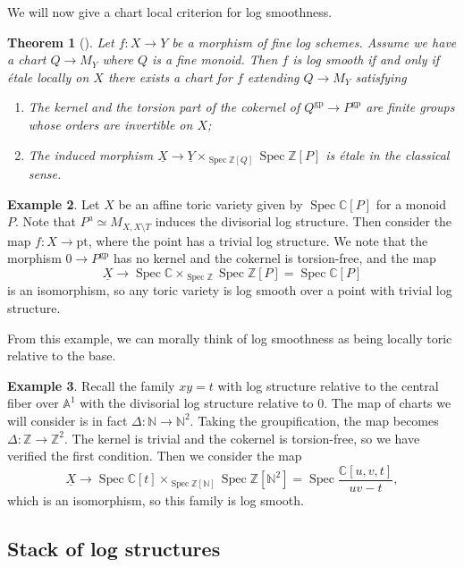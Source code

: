 \documentclass{amsart}
\newtheorem{thm}{Theorem}[section]
\theoremstyle{definition}
\newtheorem{exm}[thm]{Example}
\theoremstyle{remark}
\theoremstyle{plain}
\theoremstyle{definition}
\theoremstyle{remark}
\newcommand{\A}{\mathbb{A}}
\newcommand{\N}{\mathbb{N}}
\newcommand{\C}{\mathbb{C}}
\newcommand{\Z}{\mathbb{Z}}
\newcommand{\mr}[1]{\mathrm{#1}}
\newcommand{\ul}[1]{\underline{#1}}
\newcommand{\1}{\mathbf{1}}
\newcommand{\2}{\mathbf{2}}
\newcommand{\3}{\mathbf{3}}
\DeclareMathOperator{\Spec}{Spec}
\begin{document}
We will now give a chart local criterion for log smoothness.

\begin{thm}[{\cite[Theorem~3.5]{Kato1989}}]
    Let \(f \colon X \to Y\) be a morphism of fine log schemes. Assume we have a chart \(Q \to M_Y\) where \(Q\) is a fine monoid. Then \(f\) is log smooth if and only if \'etale locally on \(X\) there exists a chart for \(f\) extending \(Q \to M_Y\) satisfying
    \begin{enumerate}
        \item The kernel and the torsion part of the cokernel of \(Q^{\mr{gp}} \to P^{\mr{gp}}\) are finite groups whose orders are invertible on \(X\);
        \item The induced morphism \(\ul{X} \to \ul{Y} \times_{\Spec \Z[Q]} \Spec \Z[P]\) is \'etale in the classical sense.
    \end{enumerate}
\end{thm}

\begin{exm}
    Let \(X\) be an affine toric variety given by \(\Spec \C[P]\) for a monoid \(P\). Note that \(P^a \simeq M_{X, X \setminus T}\) induces the divisorial log structure. Then consider the map \(f \colon X \to \mr{pt}\), where the point has a trivial log structure. We note that the morphism \(0 \to P^{\mr{gp}}\) has no kernel and the cokernel is torsion-free, and the map
    \[ \ul{X} \to \Spec \C \times_{\Spec \Z} \Spec \Z[P] = \Spec \C[P] \]
    is an isomorphism, so any toric variety is log smooth over a point with trivial log structure.
\end{exm}

From this example, we can morally think of log smoothness as being locally toric relative to the base.

\begin{exm}
    Recall the family \(xy = t\) with log structure relative to the central fiber over \(\A^1\) with the divisorial log structure relative to \(0\). The map of charts we will consider is in fact \(\Delta \colon \N \to \N^2\). Taking the groupification, the map becomes \(\Delta \colon \Z \to \Z^2\). The kernel is trivial and the cokernel is torsion-free, so we have verified the first condition. Then we consider the map
    \[ \ul{X} \to \Spec \C[t] \times_{\Spec \Z[\N]} \Spec \Z[\N^2] = \Spec \frac{\C[u,v,t]}{uv-t}, \]
    which is an isomorphism, so this family is log smooth.
\end{exm}

\subsection{Stack of log structures}%
\label{sub:Stack of log structures}
\end{document}
